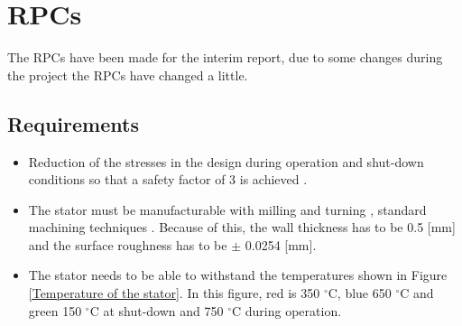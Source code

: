 \section{RPCs}
\label{AppendixF}
The RPCs have been made for the interim report, due to some changes during the project the RPCs have changed a little.
\subsection*{Requirements}
\begin{itemize}
\item Reduction of the stresses in the design during operation and shut-down conditions so that a safety factor of 3 is achieved \cite{safetyfactors}.
\item The stator must be manufacturable with milling \cite{milling} and turning \cite{turning}, standard machining techniques \cite{manufacturingprocess}. Because of this, the wall thickness has to be 0.5 [mm] and the surface roughness has to be $\pm$ 0.0254 [mm].
\item The stator needs to be able to withstand the temperatures shown in Figure \ref{Temperature of the stator}. In this figure, red is 350 $^{\circ}$C, blue 650 $^{\circ}$C and green 150 $^{\circ}$C at shut-down and 750 $^{\circ}$C during operation. 
\end{itemize}

